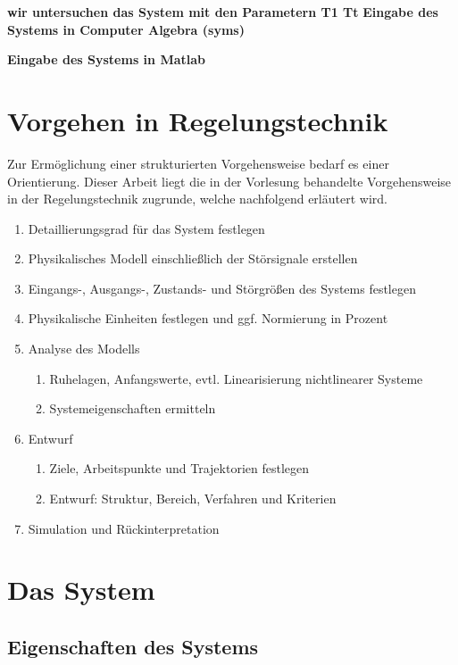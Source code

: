 

\textbf{wir untersuchen das System mit den Parametern T1 Tt}
\textbf{Eingabe des Systems in Computer Algebra (syms)}

\textbf{Eingabe des Systems in Matlab}
\section{Vorgehen in Regelungstechnik}
Zur Ermöglichung einer strukturierten Vorgehensweise bedarf es einer Orientierung. Dieser Arbeit liegt die in der Vorlesung behandelte Vorgehensweise in der Regelungstechnik zugrunde, welche nachfolgend erläutert wird.

\begin{enumerate}
    \item Detaillierungsgrad für das System festlegen
    \item Physikalisches Modell einschließlich der Störsignale erstellen
    \item Eingangs-, Ausgangs-, Zustands- und Störgrößen des Systems festlegen
    \item Physikalische Einheiten festlegen und ggf. Normierung in Prozent
    \item Analyse des Modells
    \begin{enumerate}
        \item Ruhelagen, Anfangswerte, evtl. Linearisierung nichtlinearer Systeme
        \item Systemeigenschaften ermitteln
    \end{enumerate}
    \item Entwurf
    \begin{enumerate}
        \item Ziele, Arbeitspunkte und Trajektorien festlegen
        \item Entwurf: Struktur, Bereich, Verfahren und Kriterien
    \end{enumerate}
    \item Simulation und Rückinterpretation
\end{enumerate}

\section{Das System}


\subsection{Eigenschaften des Systems}

